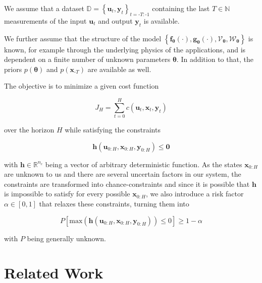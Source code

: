 We assume that a dataset $\mathbb{D} = \left\{\boldsymbol{u}_{t}, \boldsymbol{y}_{t}\right\}_{t = \text{-}T:\text{-}1}$ containing the last $T \in \mathbb{N}$ measurements of the input $\boldsymbol{u}_t$ and output $\boldsymbol{y}_t$ is available.

We further assume that the structure of the model $\left\{\boldsymbol{f}_{\boldsymbol{\theta}}(\cdot), \boldsymbol{g}_{\boldsymbol{\theta}}(\cdot), \boldsymbol{\mathcal{V}}_{\boldsymbol{\theta}}, \boldsymbol{\mathcal{W}}_{\boldsymbol{\theta}}\right\}$ is known, for example through the underlying physics of the applications, and is dependent on a finite number of unknown parameters $\boldsymbol{\theta}$. In addition to that, the priors $p(\boldsymbol{\theta})$ and $p(\boldsymbol{x}_{\text{-}T})$ are available as well.

The objective is to minimize a given cost function 

\begin{equation} \label{cost function}
J_H = \sum_{t = 0}^H c(\boldsymbol{u}_t,  \boldsymbol{x}_t,  \boldsymbol{y}_t)
\end{equation}

over the horizon $H$ while satisfying the constraints 

\begin{equation} \label{constraints}
\boldsymbol{h}(\boldsymbol{u}_{0:H},  \boldsymbol{x}_{0:H},  \boldsymbol{y}_{0:H}) \leq \boldsymbol{0}
\end{equation}

with $\boldsymbol{h} \in \mathbb{R}^{n_c}$ being a vector of arbitrary deterministic function. As the states $\boldsymbol{x}_{0:H}$ are unknown to us and there are several uncertain factors in our system, the constraints are transformed into chance-constraints and since it is possible that $\boldsymbol{h}$ is impossible to satisfy for every possible $\boldsymbol{x}_{0:H}$, we also introduce a risk factor $\alpha \in [0, 1]$ that relaxes these constraints, turning them into

\begin{equation} \label{risk constraints}
P \left[ \text{max} (\boldsymbol{h}(\boldsymbol{u}_{0:H},  \boldsymbol{x}_{0:H},  \boldsymbol{y}_{0:H})) \leq 0 \right] \geq 1 - \alpha
\end{equation}

with $P$ being generally unknown.

\section{Related Work} \label{Related Work}

